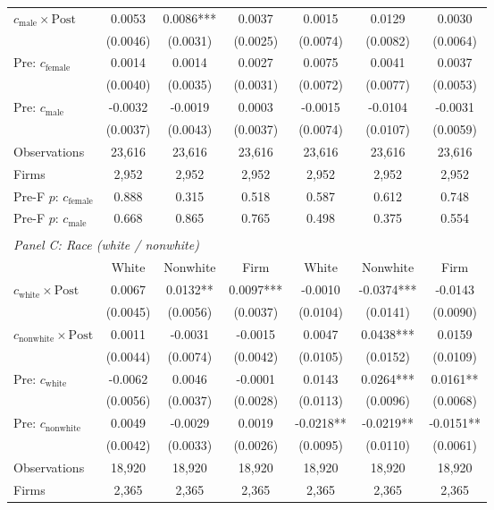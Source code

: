 \begin{table}[H]
{\begin{tabular}{lcccccc}
$c_{\text{male}} \times \text{Post}$ & 0.0053 & 0.0086*** & 0.0037 & 0.0015 & 0.0129 & 0.0030 \\
 & (0.0046) & (0.0031) & (0.0025) & (0.0074) & (0.0082) & (0.0064) \\
Pre: $c_{\text{female}}$ & 0.0014 & 0.0014 & 0.0027 & 0.0075 & 0.0041 & 0.0037 \\
 & (0.0040) & (0.0035) & (0.0031) & (0.0072) & (0.0077) & (0.0053) \\
Pre: $c_{\text{male}}$ & -0.0032 & -0.0019 & 0.0003 & -0.0015 & -0.0104 & -0.0031 \\
 & (0.0037) & (0.0043) & (0.0037) & (0.0074) & (0.0107) & (0.0059) \\
Observations & 23,616 & 23,616 & 23,616 & 23,616 & 23,616 & 23,616 \\
Firms & 2,952 & 2,952 & 2,952 & 2,952 & 2,952 & 2,952 \\
Pre-F $p$: $c_{\text{female}}$ & 0.888 & 0.315 & 0.518 & 0.587 & 0.612 & 0.748 \\
Pre-F $p$: $c_{\text{male}}$ & 0.668 & 0.865 & 0.765 & 0.498 & 0.375 & 0.554 \\
\\[4pt]
\multicolumn{7}{l}{\textit{Panel C: Race (white / nonwhite)}} \\
 & White & Nonwhite & Firm & White & Nonwhite & Firm \\
$c_{\text{white}} \times \text{Post}$ & 0.0067 & 0.0132** & 0.0097*** & -0.0010 & -0.0374*** & -0.0143 \\
 & (0.0045) & (0.0056) & (0.0037) & (0.0104) & (0.0141) & (0.0090) \\
$c_{\text{nonwhite}} \times \text{Post}$ & 0.0011 & -0.0031 & -0.0015 & 0.0047 & 0.0438*** & 0.0159 \\
 & (0.0044) & (0.0074) & (0.0042) & (0.0105) & (0.0152) & (0.0109) \\
Pre: $c_{\text{white}}$ & -0.0062 & 0.0046 & -0.0001 & 0.0143 & 0.0264*** & 0.0161** \\
 & (0.0056) & (0.0037) & (0.0028) & (0.0113) & (0.0096) & (0.0068) \\
Pre: $c_{\text{nonwhite}}$ & 0.0049 & -0.0029 & 0.0019 & -0.0218** & -0.0219** & -0.0151** \\
 & (0.0042) & (0.0033) & (0.0026) & (0.0095) & (0.0110) & (0.0061) \\
Observations & 18,920 & 18,920 & 18,920 & 18,920 & 18,920 & 18,920 \\
Firms & 2,365 & 2,365 & 2,365 & 2,365 & 2,365 & 2,365 \\

\end{tabular}}
\end{table}
